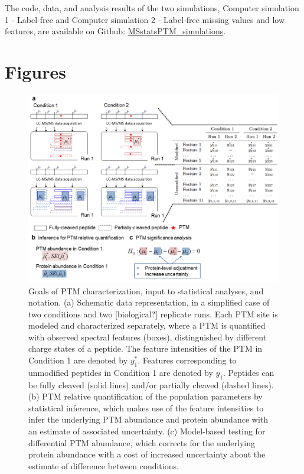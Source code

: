 \documentclass[mcp]{article}
\numberwithin{table}{section}
\def\todo#1{{\color{red}[#1]}}
\begin{document}
The code, data, and analysis results of the two simulations, Computer simulation 1 - Label-free and Computer simulation 2 - Label-free missing values and low features, are available on Github: \href{https://github.com/devonjkohler/MSstatsPTM_simulations}{MSstatsPTM\_simulations}.


\newpage
\printbibliography


\newpage
\section{Figures}

\begin{figure}[ht]
\centering
\includegraphics[scale=.6]{images/fig3.png}
\caption{
Goals of PTM characterization, input to statistical analyses, and notation. (a) Schematic data representation, in a simplified case of two conditions and two \todo{biological?} replicate runs. Each PTM site is modeled and characterized separately, where a PTM is quantified with observed spectral features (boxes), distinguished by different charge states of a peptide. The feature intensities of the PTM in Condition 1 are denoted by $y_1^\ast$. Features corresponding to unmodified peptides in Condition 1 are denoted by $y_1$. Peptides can be fully cleaved (solid lines) and/or partially cleaved (dashed lines). (b) PTM relative quantification of the population parameters by statistical inference, which makes use of the feature intensities to infer the underlying PTM abundance and protein abundance with an estimate of associated uncertainty. (c) Model-based testing for differential PTM abundance, which corrects for the underlying protein abundance with a cost of increased uncertainty about the estimate of difference between conditions.}
\label{fig:data-structure}
\end{figure}
\end{document}
